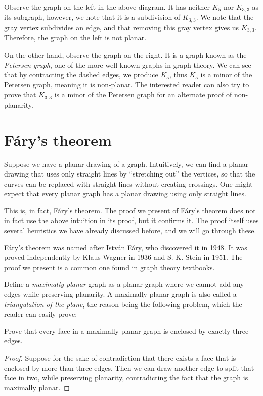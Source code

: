 \documentclass[11pt,paper=letter]{scrartcl}
\begin{document}
Observe the graph on the left in the above diagram. It has neither $K_5$ nor $K_{3,3}$ as its subgraph, however, we note that it is a subdivision of $K_{3,3}$. We note that the gray vertex subdivides an edge, and that removing this gray vertex gives us $K_{3,3}$. Therefore, the graph on the left is not planar.

On the other hand, observe the graph on the right. It is a graph known as the \emph{Petersen graph}, one of the more well-known graphs in graph theory. We can see that by contracting the dashed edges, we produce $K_5$, thus $K_5$ is a minor of the Petersen graph, meaning it is non-planar. The interested reader can also try to prove that $K_{3,3}$ is a minor of the Petersen graph for an alternate proof of non-planarity. 

\section{F\'{a}ry's theorem}

Suppose we have a planar drawing of a graph. Intuitively, we can find a planar drawing that uses only straight lines by ``stretching out'' the vertices, so that the curves can be replaced with straight lines without creating crossings. One might expect that every planar graph has a planar drawing using only straight lines.

This is, in fact, F\'{a}ry's theorem. The proof we present of F\'{a}ry's theorem does not in fact use the above intuition in its proof, but it confirms it. The proof itself uses several heuristics we have already discussed before, and we will go through these.

F\'{a}ry's theorem was named after Istv\'{a}n F\'{a}ry, who discovered it in 1948. It was proved independently by Klaus Wagner in 1936 and S. K. Stein in 1951. The proof we present is a common one found in graph theory textbooks.

Define a \emph{maximally planar} graph as a planar graph where we cannot add any edges while preserving planarity. A maximally planar graph is also called a \emph{triangulation of the plane}, the reason being the following problem, which the reader can easily prove:

\begin{problem}
Prove that every face in a maximally planar graph is enclosed by exactly three edges.
\end{problem}

\begin{proof}
Suppose for the sake of contradiction that there exists a face that is enclosed by more than three edges. Then we can draw another edge to split that face in two, while preserving planarity, contradicting the fact that the graph is maximally planar.
\end{proof}
\end{document}
